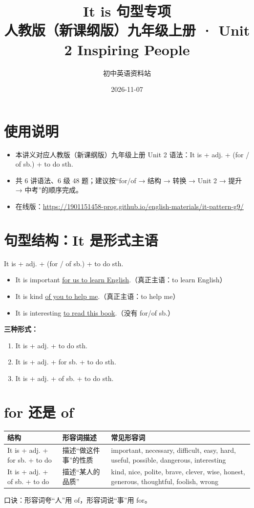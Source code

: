 \documentclass[11pt,a4paper]{ctexart}
\title{\textbf{It is 句型专项}\\[4pt]
\large 人教版（新课纲版）九年级上册 · Unit 2 Inspiring People}
\author{初中英语资料站}
\date{2026-11-07}
\begin{document}
\maketitle

\section*{使用说明}
\begin{itemize}[leftmargin=1.4em]
\item 本讲义对应人教版（新课纲版）九年级上册 Unit 2 语法：It is + adj. + (for / of sb.) + to do sth.
\item 共 6 讲语法、6 级 48 题；建议按“for/of → 结构 → 转换 → Unit 2 → 提升 → 中考”的顺序完成。
\item 在线版：\url{https://1901151458-prog.github.io/english-materials/it-pattern-g9/}
\end{itemize}

\section{句型结构：It 是形式主语}
It is + adj. + (for / of sb.) + to do sth.
\begin{itemize}[leftmargin=1.4em]
\item It is important \underline{for us to learn English}.（真正主语：to learn English）
\item It is kind \underline{of you to help me}.（真正主语：to help me）
\item It is interesting \underline{to read this book}.（没有 for/of sb.）
\end{itemize}
\textbf{三种形式：}
\begin{enumerate}[leftmargin=1.4em]
\item It is + adj. + to do sth.
\item It is + adj. + for sb. + to do sth.
\item It is + adj. + of sb. + to do sth.
\end{enumerate}

\section{for 还是 of}
\begin{center}
\begin{tabular}{p{4.6cm}p{4.2cm}p{6.8cm}}
\hline
\textbf{结构} & \textbf{形容词描述} & \textbf{常见形容词}\\
\hline
It is + adj. + for sb. + to do & 描述“做这件事”的性质 & important, necessary, difficult, easy, hard, useful, possible, dangerous, interesting\\
It is + adj. + of sb. + to do & 描述“某人的品质” & kind, nice, polite, brave, clever, wise, honest, generous, thoughtful, foolish, wrong\\
\hline
\end{tabular}
\end{center}
口诀：形容词夸“人”用 of，形容词说“事”用 for。
\end{document}
